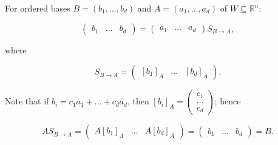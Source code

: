 For ordered bases \(B = \left( {b_{1},\ldots,b_{d}} \right)\) and \(A = \left( {a_{1},\ldots,a_{d}} \right)\) of \(W \subseteq \mathbb{R}^{n}\):

\[\begin{pmatrix}
b_{1} & \ldots & b_{d}
\end{pmatrix} = \begin{pmatrix}
a_{1} & \ldots & a_{d}
\end{pmatrix}S_{B\rightarrow A},\]

where

\[S_{B\rightarrow A} = \begin{pmatrix}
\left\lbrack b_{1} \right\rbrack_{A} & \ldots & \left\lbrack b_{d} \right\rbrack_{A}
\end{pmatrix}.\]

Note that if \(b_{i} = c_{1}a_{1} + \ldots + c_{d}a_{d}\), then \(\left\lbrack b_{i} \right\rbrack_{A} = \begin{pmatrix}
c_{1} \\
\ldots \\
c_{d}
\end{pmatrix}\); hence

\[AS_{B\rightarrow A} = \begin{pmatrix}
{A\left\lbrack b_{1} \right\rbrack}_{A} & \ldots & {A\left\lbrack b_{d} \right\rbrack}_{A}
\end{pmatrix} = \begin{pmatrix}
b_{1} & \ldots & b_{d}
\end{pmatrix} = B.\]
